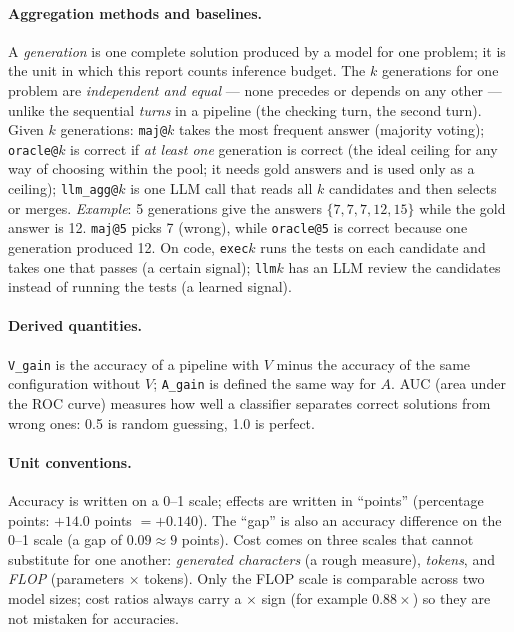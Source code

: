 \documentclass[11pt,a4paper]{article}
\begin{document}
\paragraph{Aggregation methods and baselines.} A \emph{generation} is one complete solution
produced by a model for one problem; it is the unit in which this report counts inference budget.
The $k$ generations for one problem are \emph{independent and equal} --- none precedes or depends
on any other --- unlike the sequential \emph{turns} in a pipeline (the checking turn, the second
turn). Given $k$ generations: \texttt{maj@}$k$ takes the most frequent answer (majority voting);
\texttt{oracle@}$k$ is correct if \emph{at least one} generation is correct (the ideal ceiling for
any way of choosing within the pool; it needs gold answers and is used only as a ceiling);
\texttt{llm\_agg@}$k$ is one LLM call that reads all $k$ candidates and then selects or merges.
\emph{Example}: 5 generations give the answers $\{7, 7, 7, 12, 15\}$ while the gold answer is 12.
\texttt{maj@5} picks 7 (wrong), while \texttt{oracle@5} is correct because one generation produced
12. On code, \texttt{exec}$k$ runs the tests on each candidate and takes one that passes (a
certain signal); \texttt{llm}$k$ has an LLM review the candidates instead of running the tests (a
learned signal).

\paragraph{Derived quantities.} \texttt{V\_gain} is the accuracy of a pipeline with $V$ minus the
accuracy of the same configuration without $V$; \texttt{A\_gain} is defined the same way for $A$.
AUC (area under the ROC curve) measures how well a classifier separates correct solutions from
wrong ones: 0.5 is random guessing, 1.0 is perfect.

\paragraph{Unit conventions.} Accuracy is written on a 0--1 scale; effects are written in
``points'' (percentage points: $+14.0$ points $= +0.140$). The ``gap'' is also an accuracy
difference on the 0--1 scale (a gap of $0.09 \approx 9$ points). Cost comes on three scales that
cannot substitute for one another: \emph{generated characters} (a rough measure), \emph{tokens},
and \emph{FLOP} (parameters $\times$ tokens). Only the FLOP scale is comparable across two model
sizes; cost ratios always carry a $\times$ sign (for example $0.88\times$) so they are not
mistaken for accuracies.
\end{document}
